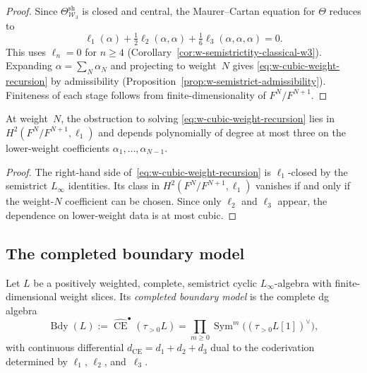 \begin{proof}
Since $\Theta_{\mathcal{W}_3}^{\mathrm{sh}}$ is closed and central,
the Maurer--Cartan equation for $\Theta$ reduces to
\[
\ell_1(\alpha) + \tfrac{1}{2}\ell_2(\alpha,\alpha)
+ \tfrac{1}{6}\ell_3(\alpha,\alpha,\alpha) = 0.
\]
This uses $\ell_n = 0$ for $n \ge 4$
(Corollary~\ref{cor:w-semistrictity-classical-w3}).  Expanding
$\alpha = \sum_N \alpha_N$ and projecting to weight~$N$ gives
\eqref{eq:w-cubic-weight-recursion} by admissibility
(Proposition~\ref{prop:w-semistrict-admissibility}).  Finiteness of
each stage follows from finite-dimensionality of $F^N/F^{N+1}$.
\end{proof}

\begin{corollary}
\label{cor:w-cubic-obstruction-classes}
At weight~$N$, the obstruction to solving
\eqref{eq:w-cubic-weight-recursion} lies in
$H^2(F^N/F^{N+1}, \ell_1)$ and depends polynomially of degree at
most three on the lower-weight coefficients
$\alpha_1, \dots, \alpha_{N-1}$.
\end{corollary}

\begin{proof}
The right-hand side of~\eqref{eq:w-cubic-weight-recursion} is
$\ell_1$-closed by the semistrict $L_\infty$ identities.  Its class
in $H^2(F^N/F^{N+1}, \ell_1)$ vanishes if and only if the weight-$N$
coefficient can be chosen.  Since only $\ell_2$ and $\ell_3$ appear,
the dependence on lower-weight data is at most cubic.
\end{proof}

\subsection{The completed boundary model}
\label{subsec:semistrict-boundary-model}

\begin{definition}
\label{def:w-completed-boundary-model}
Let $L$ be a positively weighted, complete, semistrict cyclic
$L_\infty$-algebra with finite-dimensional weight slices.  Its
\emph{completed boundary model} is the complete dg algebra
\[
\operatorname{Bdy}(L)
:= \widehat{\operatorname{CE}}^\bullet(\tau_{>0}L)
= \prod_{m \ge 0}
   \operatorname{Sym}^m\!\bigl((\tau_{>0}L[1])^\vee\bigr),
\]
with continuous differential $d_{\mathrm{CE}} = d_1 + d_2 + d_3$
dual to the coderivation determined by $\ell_1$, $\ell_2$,
and~$\ell_3$.
\end{definition}

